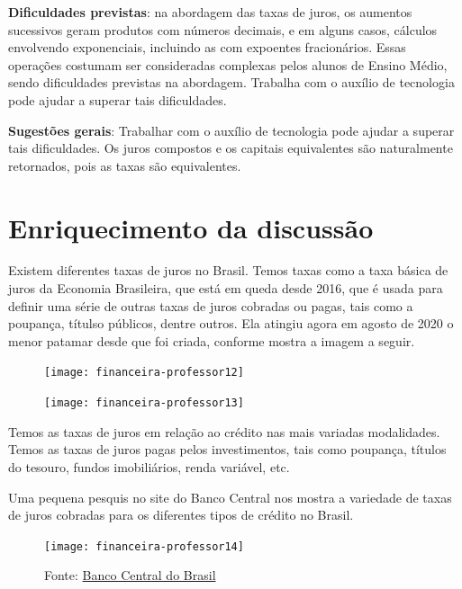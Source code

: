 \begin{paginatexto2}
\textbf{Dificuldades previstas}: na abordagem das taxas de juros, os aumentos sucessivos geram produtos com números decimais, e em alguns casos, cálculos envolvendo exponenciais, incluindo as com expoentes fracionários. Essas operações costumam ser consideradas complexas pelos alunos de Ensino Médio, sendo dificuldades previstas na abordagem. Trabalha com o auxílio de tecnologia pode ajudar a superar tais dificuldades.

\textbf{Sugestões gerais}: Trabalhar com o auxílio de tecnologia pode ajudar a superar tais dificuldades. Os juros compostos e os capitais equivalentes são naturalmente retornados, pois as taxas são equivalentes.

\section*{Enriquecimento da discussão}

Existem diferentes taxas de juros no Brasil. Temos taxas como a taxa básica de juros da Economia Brasileira, que está em queda desde 2016, que é usada para definir uma série de outras taxas de juros cobradas ou pagas, tais como a poupança, títulso públicos, dentre outros. Ela atingiu agora em agosto de 2020 o menor patamar desde que foi criada, conforme mostra a imagem a seguir.

\begin{figure}[H]
\centering

\texttt{[image: financeira-professor12]}
\end{figure}

\begin{figure}[H]
\centering

\texttt{[image: financeira-professor13]}
\end{figure}

Temos as taxas de juros em relação ao crédito nas mais variadas modalidades. Temos as taxas de juros pagas pelos investimentos, tais como poupança, títulos do tesouro, fundos imobiliários, renda variável, etc.

Uma pequena pesquis  no site do Banco Central nos mostra a variedade de taxas de juros cobradas para os diferentes tipos de crédito no Brasil.

\begin{figure}[H]
\centering

\texttt{[image: financeira-professor14]}

\caption{Fonte: \href{https://www.bcb.gov.br/estatisticas/txjuros}{Banco Central do Brasil}}
\end{figure}


\end{paginatexto2}
